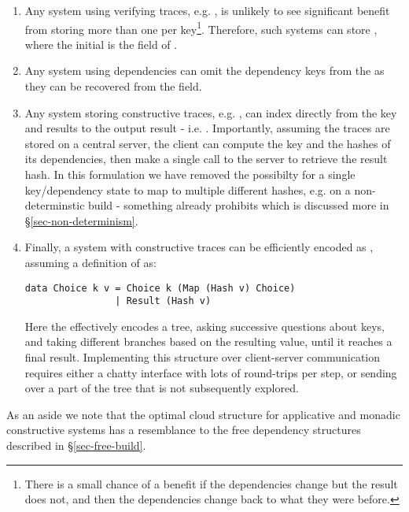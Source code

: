 \begin{enumerate}
\item Any system using verifying traces, e.g. \Shake, is unlikely to see significant benefit from storing more than one  per key\footnote{There is a small chance of a benefit if the dependencies change but the result does not, and then the dependencies change back to what they were before.}. Therefore, such systems can store , where the initial  is the  field of .
\item Any system using  dependencies can omit the dependency keys from the  as they can be recovered from the  field.
\item Any  system storing constructive traces, e.g. \Bazel, can index directly from the key and results to the output result - i.e. . Importantly, assuming the traces are stored on a central server, the client can compute the key and the hashes of its dependencies, then make a single call to the server to retrieve the result hash. In this formulation we have removed the possibilty for a single key/dependency state to map to multiple different hashes, e.g. on a non-determinstic build - something \Bazel already prohibits which is discussed more in \S\ref{sec-non-determinism}.
\item Finally, a  system with constructive traces can be efficiently encoded as , assuming a definition of  as:
\begin{verbatim}
data Choice k v = Choice k (Map (Hash v) Choice)
                | Result (Hash v)
\end{verbatim}
Here the  effectively encodes a tree, asking successive questions about keys, and taking different branches based on the resulting value, until it reaches a final result. Implementing this structure over client-server communication requires either a chatty interface with lots of round-trips per  step, or sending over a part of the tree that is not subsequently explored.
\end{enumerate}

As an aside we note that the optimal cloud structure for applicative and monadic constructive systems has a resemblance to the free dependency structures described in \S\ref{sec-free-build}.
